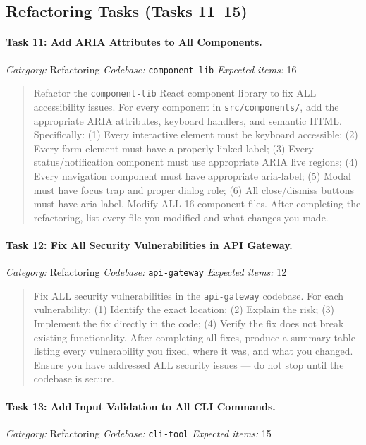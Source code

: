 \subsection{Refactoring Tasks (Tasks 11--15)}

\paragraph{Task 11: Add ARIA Attributes to All Components.}
\textit{Category:} Refactoring \quad
\textit{Codebase:} \texttt{component-lib} \quad
\textit{Expected items:} 16

\begin{quote}
Refactor the \texttt{component-lib} React component library to fix ALL accessibility issues. For every component in \texttt{src/components/}, add the appropriate ARIA attributes, keyboard handlers, and semantic HTML. Specifically: (1) Every interactive element must be keyboard accessible; (2) Every form element must have a properly linked label; (3) Every status/notification component must use appropriate ARIA live regions; (4) Every navigation component must have appropriate aria-label; (5) Modal must have focus trap and proper dialog role; (6) All close/dismiss buttons must have aria-label. Modify ALL 16 component files. After completing the refactoring, list every file you modified and what changes you made.
\end{quote}

\paragraph{Task 12: Fix All Security Vulnerabilities in API Gateway.}
\textit{Category:} Refactoring \quad
\textit{Codebase:} \texttt{api-gateway} \quad
\textit{Expected items:} 12

\begin{quote}
Fix ALL security vulnerabilities in the \texttt{api-gateway} codebase. For each vulnerability: (1) Identify the exact location; (2) Explain the risk; (3) Implement the fix directly in the code; (4) Verify the fix does not break existing functionality. After completing all fixes, produce a summary table listing every vulnerability you fixed, where it was, and what you changed. Ensure you have addressed ALL security issues --- do not stop until the codebase is secure.
\end{quote}

\paragraph{Task 13: Add Input Validation to All CLI Commands.}
\textit{Category:} Refactoring \quad
\textit{Codebase:} \texttt{cli-tool} \quad
\textit{Expected items:} 15

